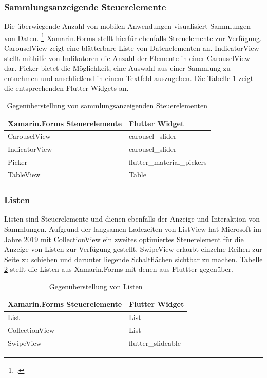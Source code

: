 \subsubsection{Sammlungsanzeigende Steuerelemente}
Die überwiegende Anzahl von mobilen Anwendungen visualisiert Sammlungen von Daten. \footcite[Vgl.][S. 180]{Hindrikes2020}  Xamarin.Forms stellt hierfür ebenfalls Streuelemente zur Verfügung. \glq CarouselView\grq{}  zeigt eine blätterbare Liste von Datenelementen an.   \glq IndicatorView\grq{} stellt mithilfe von Indikatoren die Anzahl der Elemente in einer  \glq CarouselView\grq{} dar.  \glq Picker\grq{}  bietet die Möglichkeit, eine Auswahl aus einer Sammlung zu entnehmen und anschließend in einem Textfeld auszugeben.   Die Tabelle \ref{tab:Collections} zeigt die entsprechenden Flutter Widgets an.


\begin{table}[!ht]
\begin{tabularx}{\textwidth}{|X|X|}
\hline
   \textbf{Xamarin.Forms Steuerelemente} & \textbf{Flutter Widget}  \\
\hline
	CarouselView		       		&  	carousel\_slider  		\\ 
	IndicatorView		       		&  	carousel\_slider		\\ 	
	Picker		       					&  	flutter\_material\_pickers		\\ 
	TableView		       				&  	Table		\\ 
\hline
\end{tabularx}
\caption{Gegenüberstellung von sammlungsanzeigenden Steuerelementen}
 \label{tab:Collections}
\end{table}


\subsubsection{Listen}

Listen sind  Steuerelemente und dienen ebenfalls der Anzeige und Interaktion von Sammlungen.  Aufgrund der langsamen Ladezeiten von \glq ListView\grq{} hat Microsoft im Jahre 2019 mit  \glq CollectionView\grq{}  ein zweites optimiertes Steuerelement für die Anzeige von Listen zur Verfügung gestellt.   \glq SwipeView\grq{} erlaubt einzelne Reihen zur Seite zu schieben und darunter liegende Schaltflächen sichtbar zu machen.  Tabelle \ref{tab:Listview} stellt die Listen aus Xamarin.Forms mit denen aus Fluttter gegenüber.  
\begin{table}[!ht]
\begin{tabularx}{\textwidth}{|X|X|}
\hline
   \textbf{Xamarin.Forms Steuerelemente} & \textbf{Flutter Widget}  \\
\hline
	List		       				&  	List 		\\ 
	CollectionView		       				&  	List 		\\ 
	SwipeView		       		&  	flutter\_slideable 		\\ 
	\hline

\end{tabularx}
\caption{Gegenüberstellung von Listen}
 \label{tab:Listview}
\end{table}

